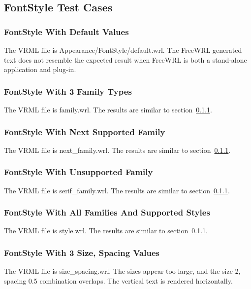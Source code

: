 \documentclass[12pt,letterpaper]{article}
\newcommand{\FSA}{FontStyle With Default Values}
\newcommand{\FSB}{FontStyle With 3 Family Types}
\newcommand{\FSC}{FontStyle With Next Supported Family}
\newcommand{\FSD}{FontStyle With Unsupported Family}
\newcommand{\FSE}{FontStyle With All Families And Supported Styles}
\newcommand{\FSF}{FontStyle With 3 Size, Spacing Values}
\begin{document}
\subsection{FontStyle Test Cases}

\subsubsection{\FSA}
\label{sec:fs-default}
The VRML file is Appearance/FontStyle/default.wrl.
The FreeWRL generated text does not resemble the expected result when FreeWRL is both 
a stand-alone application and plug-in.

\subsubsection{\FSB}
\label{sec:3-families}
The VRML file is family.wrl.\newline
The results are similar to section~\ref{sec:fs-default}.

\subsubsection{\FSC}
The VRML file is next\_family.wrl.\newline
The results are similar to section~\ref{sec:fs-default}.

\subsubsection{\FSD}
The VRML file is serif\_family.wrl.\newline
The results are similar to section~\ref{sec:fs-default}.

\subsubsection{\FSE}
The VRML file is style.wrl.\newline
The results are similar to section~\ref{sec:fs-default}.

\subsubsection{\FSF}
The VRML file is size\_spacing.wrl.\newline
The sizes appear too large, and the size 2, spacing 0.5 combination overlaps.
The vertical text is rendered horizontally.  
\end{document}
